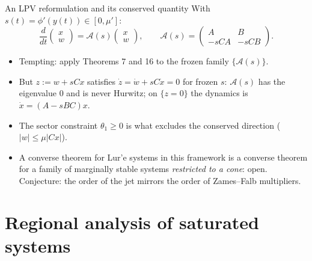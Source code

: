 \documentclass[10pt,aspectratio=169]{beamer}
\begin{document}
\begin{frame}{An LPV reformulation and its conserved quantity}
With $s(t)=\phi'(y(t))\in[0,\mu']$:
\[
\frac{d}{dt}\begin{pmatrix}x\\w\end{pmatrix}=\mathcal A(s)\begin{pmatrix}x\\w\end{pmatrix},\qquad\mathcal A(s)=\begin{pmatrix}A&B\\-sCA&-sCB\end{pmatrix}.
\]
\begin{itemize}
\item Tempting: apply Theorems 7 and 16 to the frozen family $\{\mathcal A(s)\}$.
\item But $z:=w+sCx$ satisfies $\dot z=\dot w+sC\dot x=0$ for frozen $s$: $\mathcal A(s)$ has the eigenvalue $0$ and is \alert{never Hurwitz}; on $\{z=0\}$ the dynamics is $\dot x=(A-sBC)x$.
\item The sector constraint $\theta_1\ge0$ is what excludes the conserved direction ($|w|\le\mu|Cx|$).
\item A converse theorem for Lur'e systems in this framework is a converse theorem for a family of marginally stable systems \emph{restricted to a cone}: open. Conjecture: the order of the jet mirrors the order of Zames--Falb multipliers.
\end{itemize}
\end{frame}

\section{Regional analysis of saturated systems}
\end{document}
